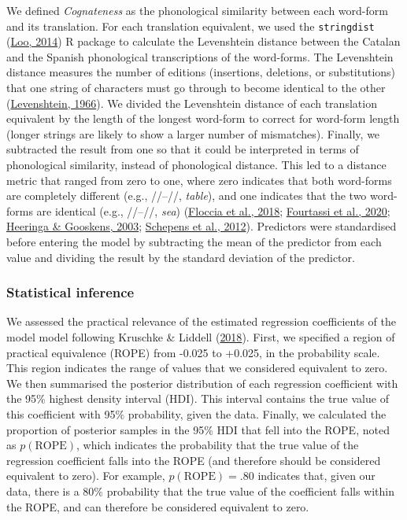 \documentclass[
]{article}
\begin{document}
We defined \emph{Cognateness} as the phonological similarity between
each word-form and its translation. For each translation equivalent, we
used the \texttt{stringdist}
(\protect\hyperlink{ref-vanderloo2014stringdist}{Loo, 2014}) R package
to calculate the Levenshtein distance between the Catalan and the
Spanish phonological transcriptions of the word-forms. The Levenshtein
distance measures the number of editions (insertions, deletions, or
substitutions) that one string of characters must go through to become
identical to the other
(\protect\hyperlink{ref-levenshtein1966binary}{Levenshtein, 1966}). We
divided the Levenshtein distance of each translation equivalent by the
length of the longest word-form to correct for word-form length (longer
strings are likely to show a larger number of mismatches). Finally, we
subtracted the result from one so that it could be interpreted in terms
of phonological similarity, instead of phonological distance. This led
to a distance metric that ranged from zero to one, where zero indicates
that both word-forms are completely different (e.g.,
//--//, \emph{table}), and one
indicates that the two word-forms are identical (e.g.,
//--//, \emph{sea})
(\protect\hyperlink{ref-floccia2018introduction}{Floccia et al., 2018};
\protect\hyperlink{ref-fourtassi2020growth}{Fourtassi et al., 2020};
\protect\hyperlink{ref-heeringa2003norwegian}{Heeringa \& Gooskens,
2003}; \protect\hyperlink{ref-schepens2012distributions}{Schepens et
al., 2012}). Predictors were standardised before entering the model by
subtracting the mean of the predictor from each value and dividing the
result by the standard deviation of the predictor.

\hypertarget{statistical-inference}{%
\subsubsection{Statistical inference}\label{statistical-inference}}

We assessed the practical relevance of the estimated regression
coefficients of the model model following Kruschke \& Liddell
(\protect\hyperlink{ref-kruschke2018bayesian}{2018}). First, we
specified a region of practical equivalence (ROPE) from -0.025 to
+0.025, in the probability scale. This region indicates the range of
values that we considered equivalent to zero. We then summarised the
posterior distribution of each regression coefficient with the 95\%
highest density interval (HDI). This interval contains the true value of
this coefficient with 95\% probability, given the data. Finally, we
calculated the proportion of posterior samples in the 95\% HDI that fell
into the ROPE, noted as \(p(\text{ROPE})\), which indicates the
probability that the true value of the regression coefficient falls into
the ROPE (and therefore should be considered equivalent to zero). For
example, \(p(\text{ROPE})=.80\) indicates that, given our data, there is
a 80\% probability that the true value of the coefficient falls within
the ROPE, and can therefore be considered equivalent to zero.
\end{document}
